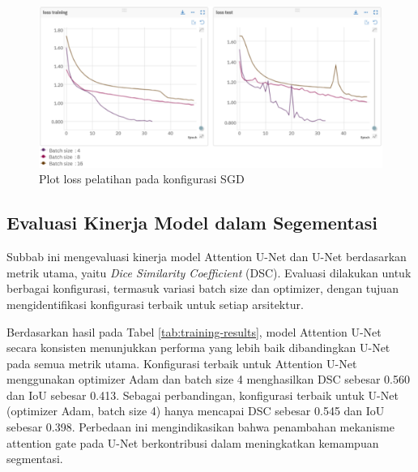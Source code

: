 \begin{figure}[H]
	\centering
	\includegraphics[width=1\textwidth]{gambar/bab4/loss_sgd.png}
	\caption{Plot loss pelatihan pada konfigurasi SGD}
	\label{fig:plot_train_sgd}
\end{figure}

\subsection{Evaluasi Kinerja Model dalam Segementasi}

\noindent Subbab ini mengevaluasi kinerja model Attention U-Net dan U-Net berdasarkan metrik utama, yaitu \textit{Dice Similarity Coefficient} (DSC). Evaluasi dilakukan untuk berbagai konfigurasi, termasuk variasi batch size dan optimizer, dengan tujuan mengidentifikasi konfigurasi terbaik untuk setiap arsitektur. 

\noindent Berdasarkan hasil pada Tabel \ref{tab:training-results}, model Attention U-Net secara konsisten menunjukkan performa yang lebih baik dibandingkan U-Net pada semua metrik utama. Konfigurasi terbaik untuk Attention U-Net menggunakan optimizer Adam dan batch size 4 menghasilkan DSC sebesar 0.560 dan IoU sebesar 0.413. Sebagai perbandingan, konfigurasi terbaik untuk U-Net (optimizer Adam, batch size 4) hanya mencapai DSC sebesar 0.545 dan IoU sebesar 0.398. Perbedaan ini mengindikasikan bahwa penambahan mekanisme attention gate pada U-Net berkontribusi dalam meningkatkan kemampuan segmentasi.



